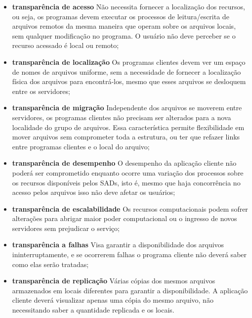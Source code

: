 	\begin{itemize}
		
	\item\textbf{transparência de acesso} Não necessita fornecer a localização dos recursos, ou seja, os programas devem executar os processos de leitura/escrita de arquivos remotos da mesma maneira que operam sobre os arquivos locais, sem qualquer modificação no programa. O usuário não deve perceber se o recurso acessado é local ou remoto;
	
	\item\textbf{transparência de localização} Os programas clientes devem ver um espaço de nomes de arquivos uniforme, sem a necessidade de fornecer a localização física dos arquivos para encontrá-los, mesmo que esses arquivos se desloquem entre os servidores;
	
	\item\textbf{transparência de migração} Independente dos arquivos se moverem entre servidores, os programas clientes não precisam ser alterados para a nova localidade do grupo de arquivos. Essa característica permite flexibilidade em mover arquivos sem comprometer toda a estrutura, ou ter que refazer links entre programas clientes e o local do arquivo;
	
	\item\textbf{transparência de desempenho} O desempenho da aplicação cliente não poderá ser comprometido enquanto ocorre uma variação dos processos sobre os recursos disponíveis pelos SADs, isto é, mesmo que haja concorrência no acesso pelos arquivos isso não deve afetar os usuários;
	
	\item\textbf{transparência de escalabilidade} Os recursos computacionais podem sofrer alterações para abrigar maior poder computacional ou o ingresso de novos servidores sem prejudicar o serviço;
	
	\item\textbf{transparência a falhas} Visa garantir a disponibilidade dos arquivos ininterruptamente, e se ocorrerem falhas o programa cliente não deverá saber como elas serão tratadas;
	
	\item\textbf{transparência de replicação} Várias cópias dos mesmos arquivos armazenados em locais diferentes para garantir a disponibilidade. A aplicação cliente deverá
	visualizar apenas uma cópia do mesmo arquivo, não necessitando saber a quantidade replicada e os locais.
	
	\end{itemize}
		
